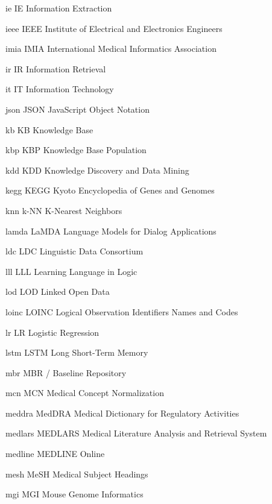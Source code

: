 \newabbreviation
{ie}
{IE}
{Information Extraction}

\newabbreviation
{ieee}
{IEEE}
{Institute of Electrical and Electronics Engineers}

\newabbreviation
{imia}
{IMIA}
{International Medical Informatics Association}

\newabbreviation
{ir}
{IR}
{Information Retrieval}

\newabbreviation
{it}
{IT}
{Information Technology}

\newabbreviation
{json}
{JSON}
{JavaScript Object Notation}

\newabbreviation
{kb}
{KB}
{Knowledge Base}

\newabbreviation
{kbp}
{KBP}
{Knowledge Base Population}

\newabbreviation
{kdd}
{KDD}
{Knowledge Discovery and Data Mining}

\newabbreviation
{kegg}
{KEGG}
{Kyoto Encyclopedia of Genes and Genomes}

\newabbreviation
{knn}
{k-NN}
{K-Nearest Neighbors}

\newabbreviation
{lamda}
{LaMDA}
{Language Models for Dialog Applications}

\newabbreviation
{ldc}
{LDC}
{Linguistic Data Consortium}

\newabbreviation
{lll}
{LLL}
{Learning Language in Logic}

\newabbreviation
{lod}
{LOD}
{Linked Open Data}

\newabbreviation
{loinc}
{LOINC}
{Logical Observation Identifiers Names and Codes}

\newabbreviation
{lr}
{LR}
{Logistic Regression}

\newabbreviation
{lstm}
{LSTM}
{Long Short-Term Memory}

\newabbreviation
{mbr}
{MBR}
{/ Baseline Repository}

\newabbreviation
{mcn}
{MCN}
{Medical Concept Normalization}

\newabbreviation
{meddra}
{MedDRA}
{Medical Dictionary for Regulatory Activities}

\newabbreviation
{medlars}
{MEDLARS}
{Medical Literature Analysis and Retrieval System}

\newabbreviation
{medline}
{MEDLINE}
{ Online}

\newabbreviation
{mesh}
{MeSH}
{Medical Subject Headings}

\newabbreviation
{mgi}
{MGI}
{Mouse Genome Informatics}

